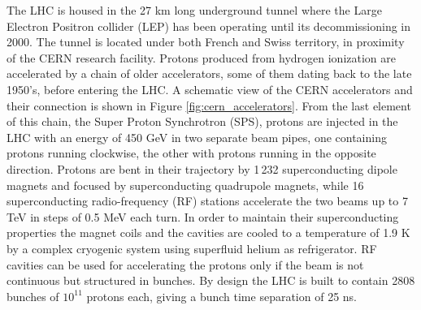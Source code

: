 The LHC is housed in the 27 km long underground tunnel where the Large Electron Positron collider (LEP) has been operating until its decommissioning in 2000. The tunnel is located under both French and Swiss territory, in proximity of the CERN research facility. 
Protons produced from hydrogen ionization are accelerated by a chain of older accelerators, some of them dating back to the late 1950's, before entering the LHC. %
A schematic view of the CERN accelerators and their connection is shown in Figure \ref{fig:cern_accelerators}. From the last element of this chain, the Super Proton Synchrotron (SPS), protons are injected in the LHC with an energy of 450 GeV in two separate beam pipes, one containing protons running clockwise, the other with protons running in the opposite direction. Protons are bent in their trajectory by 1\,232 superconducting dipole magnets and focused by  superconducting quadrupole magnets, while 16 superconducting radio-frequency (RF) stations 
accelerate the two beams up to 7 TeV in steps of 0.5 MeV each turn. In order to maintain their superconducting properties the magnet coils and the cavities are cooled to a temperature of 1.9 K by a complex cryogenic system using superfluid helium as refrigerator. RF cavities can be used for accelerating the protons only if the beam is not continuous but structured in bunches. By design the LHC is built to contain 2808 bunches of $10^{11}$ protons each, giving a bunch time separation of 25 ns.


